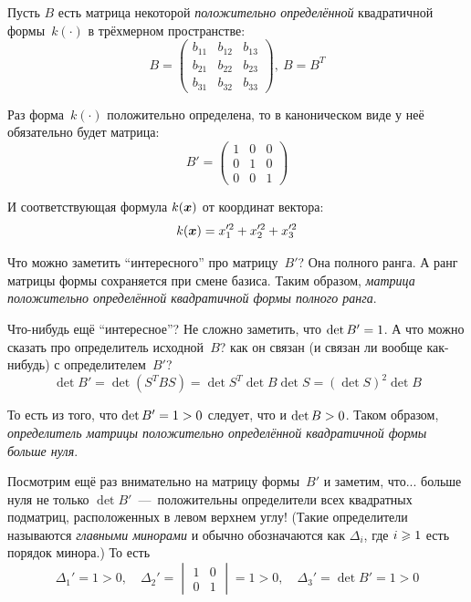 \documentclass[a4paper,12pt]{article}
\begin{document}
  \begin{example}
    Пусть $B$ есть матрица некоторой \emph{положительно определённой} квадратичной формы~$k(\cdot)$ в трёхмерном пространстве:
    \[
      B = \begin{pmatrix}
        b_{11} & b_{12} & b_{13}\\
        b_{21} & b_{22} & b_{23}\\
        b_{31} & b_{32} & b_{33}
      \end{pmatrix},\ B = B^T
    \]
    
    Раз форма~$k(\cdot)$ положительно определена, то в каноническом виде у неё обязательно будет матрица:
    \[
      B' = \begin{pmatrix}
        1 & 0 & 0\\
        0 & 1 & 0\\
        0 & 0 & 1
      \end{pmatrix}
    \]
    
    И соответствующая формула $k(\boldsymbol x)$ от координат вектора:
    \[
      k(\boldsymbol x) = x_1^{\prime 2} + x_2^{\prime 2} + x_3^{\prime 2}
    \]
    
    Что можно заметить ``интересного'' про матрицу~$B'$?
    Она полного ранга.
    А ранг матрицы формы сохраняется при смене базиса.
    Таким образом, \emph{матрица положительно определённой квадратичной формы полного ранга}.
    
    Что-нибудь ещё ``интересное''?
    Не сложно заметить, что $\det B' \hm= 1$.
    А что можно сказать про определитель исходной~$B$?
    как он связан (и связан ли вообще как-нибудь) с определителем~$B'$?
    \[
      \det B' = \det (S^T B S) = \det S^T \det B \det S = (\det S)^2 \det B
    \]
    
    То есть из того, что $\det B' \hm= 1 \hm> 0$ следует, что и $\det B \hm> 0$.
    Таком образом, \emph{определитель матрицы положительно определённой квадратичной формы больше нуля}.
    
    Посмотрим ещё раз внимательно на матрицу формы~$B'$ и заметим, что...
    больше нуля не только $\det B'$~---~положительны определители всех квадратных подматриц, расположенных в левом верхнем углу!
    (Такие определители называются \emph{главными минорами} и обычно обозначаются как $\Delta_i$, где $i \hm\geq 1$ есть порядок минора.)
    То есть
    \[
      \Delta_1' = 1 > 0,
      \quad \Delta_2' = \begin{vmatrix}
        1 & 0\\
        0 & 1
      \end{vmatrix} = 1 > 0,
      \quad \Delta_3' = \det B' = 1 > 0
    \]
    

\end{example}
\end{document}
